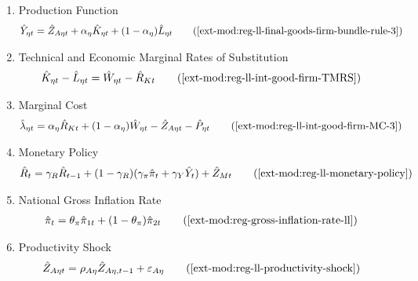 \documentclass[../thesis.tex]{subfiles}
\begin{document}
{\begin{itemize}
\begin{enumerate}
\begin{comment}
				\item Euler equation for regional consumption
				\begin{align}
					\hat{C}_{1, t+1} - \hat{C}_{1t} = \hat{C}_{2, t+1} - \hat{C}_{2t} \tag{\ref{ext-mod:reg-bonds-euler-equation-2-ll}}
				\end{align}
			\end{comment}
			
			\item Production Function
			\begin{align}
				\hat{Y}_{\eta t} &= \hat{Z}_{A\eta t} + {\alpha_{\eta}} \hat{K}_{\eta t} + (1-\alpha_{\eta}) \hat{L}_{\eta t} \tag{\ref{ext-mod:reg-ll-final-goods-firm-bundle-rule-3}}
			\end{align}
			
			\item Technical and Economic Marginal Rates of Substitution %
			\begin{align}
				\hat{K}_{\eta t} - \hat{L}_{\eta t} &= \hat{W}_{\eta t} - \hat{R}_{K t} \tag{\ref{ext-mod:reg-ll-int-good-firm-TMRS}}
			\end{align}
			
			\item Marginal Cost
			\begin{align}
				\hat{\lambda}_{\eta t} &= {\alpha_{\eta}} \hat{R}_{Kt} + (1- {\alpha_{\eta}}) \hat{W}_{\eta t} - \hat{Z}_{A\eta t} - \hat{P}_{\eta t} \tag{\ref{ext-mod:reg-ll-int-good-firm-MC-3}}
			\end{align}
			
			\item Monetary Policy
			\begin{align}
				\hat{R}_t = \gamma_{R} \hat{R}_{t-1} + (1-\gamma_{R})(\gamma_{\pi} \hat{\pi}_t + \gamma_{Y} \hat{Y}_t) + \hat{Z}_{Mt} \tag{\ref{ext-mod:reg-ll-monetary-policy}}
			\end{align}
			
			\item National Gross Inflation Rate
			\begin{align}
				\hat{\pi}_{t} &= \theta_{\pi} \hat{\pi}_{1t} + (1 - \theta_{\pi}) \hat{\pi}_{2t} \tag{\ref{ext-mod:reg-gross-inflation-rate-ll}}
			\end{align}
			
			\item Productivity Shock
			\begin{alignat}{2}
				\hat{Z}_{A\eta t} &= \rho_{A\eta} \hat{Z}_{A\eta, t-1} + \varepsilon_{A\eta} \tag{\ref{ext-mod:reg-ll-productivity-shock}}
			\end{alignat}
			

\end{enumerate}
\end{itemize}}
\end{document}
